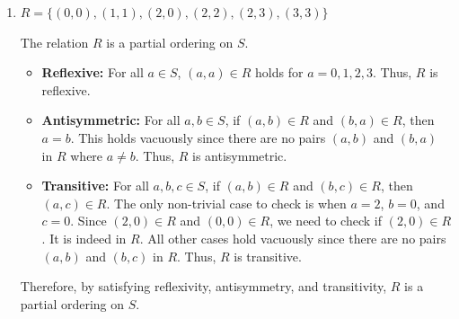 \begin{enumerate}
\begin{enumerate}
\begin{subanswer}
\begin{itemize}
        \item \textbf{Antisymmetric:} For all $a, b \in S$, if $(a,b) \in R$ and $(b,a) \in R$, then $a = b$. 
        This holds vacuously since there are no pairs $(a,b)$ and $(b,a)$ in $R$ where $a \neq b$. 
        Thus, $R$ is antisymmetric.
        \item \textbf{Transitive:} For all $a, b, c \in S$, if $(a,b) \in R$ and $(b,c) \in R$, then $(a,c) \in R$. 
        This holds vacuously since there are no pairs $(a,b)$ and $(b,c)$ in $R$. 
        Thus, $R$ is transitive.
      \end{itemize}
      Therefore, by the lack of reflexivity on the entire set $S$, $R$ is not a partial ordering on $S$.
    \end{subanswer}

    \item $R=\{(0,0),(1,1),(2,0),(2,2),(2,3),(3,3)\}$
    \begin{subanswer}
      The relation $R$ is a partial ordering on $S$.
      \begin{itemize}
        \item \textbf{Reflexive:} For all $a \in S$, $(a,a) \in R$ holds for $a = 0, 1, 2, 3$. 
        Thus, $R$ is reflexive.
        \item \textbf{Antisymmetric:} For all $a, b \in S$, if $(a,b) \in R$ and $(b,a) \in R$, then $a = b$. 
        This holds vacuously since there are no pairs $(a,b)$ and $(b,a)$ in $R$ where $a \neq b$. 
        Thus, $R$ is antisymmetric.
        \item \textbf{Transitive:} For all $a, b, c \in S$, if $(a,b) \in R$ and $(b,c) \in R$, then $(a,c) \in R$. 
        The only non-trivial case to check is when $a=2$, $b=0$, and $c=0$. 
        Since $(2,0) \in R$ and $(0,0) \in R$, we need to check if $(2,0) \in R$. 
        It is indeed in $R$. 
        All other cases hold vacuously since there are no pairs $(a,b)$ and $(b,c)$ in $R$. 
        Thus, $R$ is transitive.
      \end{itemize}
      Therefore, by satisfying reflexivity, antisymmetry, and transitivity, $R$ is a partial ordering on $S$.
      \begin{center}
        \begin{minipage}{0.4\textwidth}
          \centering
\end{minipage}
\end{center}
\end{subanswer}
\end{enumerate}
\end{enumerate}

